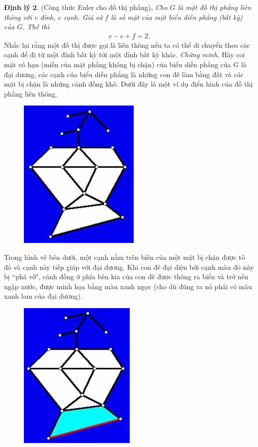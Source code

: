 \begin{multicols}{2}
	\vskip 0.1cm
	\textbf{\color{hoccungpi}Định lý} $\pmb{2.}$ (Công thức Euler cho đồ thị phẳng)\textbf{\color{hoccungpi}.} \textit{Cho $G$ là một đồ thị phẳng liên thông  với $v$ đỉnh, $e$ cạnh. Giả sử $f$ là số mặt của một biểu diễn phẳng (bất kỳ) của $G$. Thế thì}
	\begin{align*}
		v-e + f =2.
	\end{align*}
	Nhắc lại rằng một đồ thị được gọi là liên thông nếu ta có thể di chuyển theo các cạnh để đi từ một đỉnh bất kỳ tới một đỉnh bất kỳ khác.
	\vskip 0.1cm
	\textit{Chứng minh.} Hãy coi mặt vô hạn (miền của mặt phẳng không bị chặn) của biểu diễn phẳng của $G$ là đại dương, các cạnh của biểu diễn phẳng là những con đê làm bằng đất và các mặt bị chặn là những cánh đồng khô. Dưới đây là một ví dụ điển hình của đồ thị phẳng liên thông.
	\begin{figure}[H]
		\centering
		\vspace*{-5pt}
		\captionsetup{labelformat= empty, justification=centering}
		\includegraphics[width=0.5\linewidth]{proof_Euler_1}
		\vspace*{-10pt}
	\end{figure}
	Trong hình vẽ bên dưới, một cạnh nằm trên biên của một mặt bị chặn được tô đỏ và cạnh này tiếp giáp với đại dương. Khi con đê đại diện bởi cạnh màu đỏ này bị ``phá vỡ", cánh đồng ở phía bên kia của con đê được thông ra biển và trở nên ngập nước, được minh họa bằng màu xanh ngọc (cho dù đúng ra nó phải có màu xanh lam của đại dương).
	\begin{figure}[H]
		\centering
		\vspace*{5pt}
		\captionsetup{labelformat= empty, justification=centering}
		\includegraphics[width=0.5\linewidth]{proof_Euler_2}

\end{figure}
\end{multicols}
